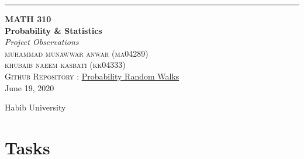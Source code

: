 \documentclass[a4paper, 11pt]{book} %
\begin{document}

\begin{titlepage} %
	
	\raggedleft %
	
	\rule{1pt}{\textheight} %
	\hspace{0.05\textwidth} %
	\parbox[b]{0.75\textwidth}
	{ %
		
		{\Huge\bfseries MATH 310  \\[0.5\baselineskip] Probability \& Statistics}\\[2\baselineskip] %
		{\large\textit{Project Observations}}\\[4\baselineskip] %
		{\Large\textsc{muhammad munawwar anwar (ma04289) \\ khubaib naeem kasbati (kk04333) }}\\[2\baselineskip] %
		 {\Large\textsc{Github Repository : }} \href{https://github.com/khubaibkay1/ProbabilityRandomWalks}{Probability Random Walks}\\[2\baselineskip]
        {\large June 19, 2020}\\[2cm] %
		\vspace{0.5\textheight} %

		{\noindent Habib University}\\[\baselineskip] %
		
	}
	
    
\end{titlepage}
\tableofcontents


\listoffigures


\newpage

\section*{Tasks}
\end{document}
